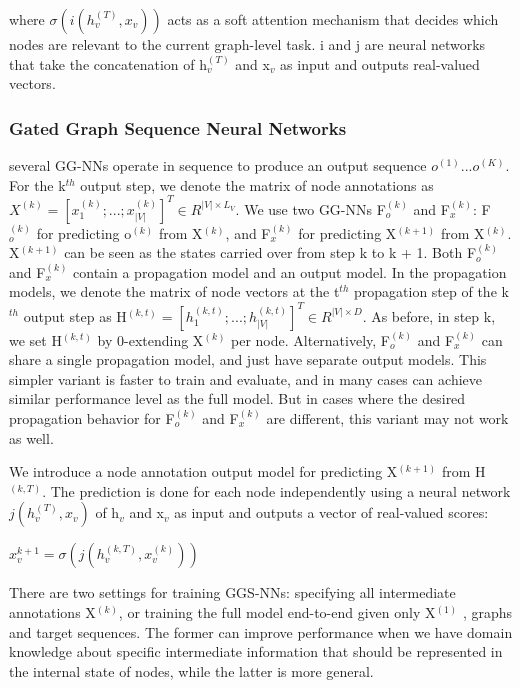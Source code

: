 \documentclass{article}
\begin{document}
where $\sigma(i(h_v^{(T)},x_v))$ acts as a soft attention mechanism that decides which nodes are relevant to the current graph-level task. i and j are neural networks that take the concatenation of h$_v^{(T)}$ and x$_v$ as input and outputs real-valued vectors.
\subsubsection{Gated Graph Sequence Neural Networks}
several GG-NNs operate in sequence to produce an output sequence $o^{(1)} . . . o^{(K )}$. For the k$^{th}$ output step, we denote the matrix of node annotations as $X^{(k)} = [x_1^{(k)}; . . . ; x_{|V|}^{(k)}]^T \in R^{|V|×L_V}$. We use two GG-NNs F$_o^{(k)}$ and F$_x^{(k)}$: F$_o^{(k)}$ for predicting o$^{(k)}$ from X$^{(k)}$, and F$^{(k)}_x$ for predicting X$^{(k+1)}$ from X$^{(k)}$. X$^{(k+1)}$ can be seen as the states carried over from step k to k + 1. Both F$_o^{(k)}$ and F$_x^{(k)}$ contain a propagation model and an output model. In the propagation models, we denote the matrix of node vectors at the t$^{th}$ propagation step of the k$^{th}$ output step as H$^{(k,t)} = [h_1^{(k,t)};...;h_{|V|}^{(k,t)}]^T \in R^{|V|×D}$. As before, in step k, we set H$^{(k,t)}$ by 0-extending X$^{(k)}$ per node. Alternatively, F$_o^{(k)}$ and F$_x^{(k)}$ can share a single propagation model, and just have separate output models. This simpler variant is faster to train and evaluate, and in many cases can achieve similar performance level as the full model. But in cases where the desired propagation behavior for F$_o^{(k)}$ and F$_x^{(k)}$ are different, this variant may not work as well.

We introduce a node annotation output model for predicting X$^{(k+1)}$ from H$^{(k,T)}$. The prediction is done for each node independently using a neural network $j(h_v^{(T)},x_v)$ of h$_v$ and x$_v$ as input and outputs a vector of real-valued scores:

\begin{math}
x_v^{k+1} = \sigma(j(h_v^{(k,T)},x_v^{(k)}))
\end{math}

There are two settings for training GGS-NNs: specifying all intermediate annotations X$^{(k)}$, or training the full model end-to-end given only X$^{(1)}$ , graphs and target sequences. The former can improve performance when we have domain knowledge about specific intermediate information that should be represented in the internal state of nodes, while the latter is more general.
\end{document}
